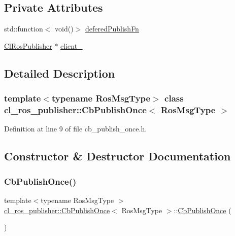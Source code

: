 \subsection*{Private Attributes}
\begin{DoxyCompactItemize}
\item 
std\+::function$<$ void()$>$ \hyperlink{classcl__ros__publisher_1_1CbPublishOnce_a6222a91fb87cd3118ca9f84ff857c696}{defered\+Publish\+Fn}
\item 
\hyperlink{classcl__ros__publisher_1_1ClRosPublisher}{Cl\+Ros\+Publisher} $\ast$ \hyperlink{classcl__ros__publisher_1_1CbPublishOnce_aabb127ac2192a295ce9d11c63f3c9595}{client\+\_\+}
\end{DoxyCompactItemize}


\subsection{Detailed Description}
\subsubsection*{template$<$typename Ros\+Msg\+Type$>$\newline
class cl\+\_\+ros\+\_\+publisher\+::\+Cb\+Publish\+Once$<$ Ros\+Msg\+Type $>$}



Definition at line 9 of file cb\+\_\+publish\+\_\+once.\+h.



\subsection{Constructor \& Destructor Documentation}
\mbox{\label{classcl__ros__publisher_1_1CbPublishOnce_a9706b20ed8ed9af79396a446abf44344}} 
\subsubsection{\texorpdfstring{Cb\+Publish\+Once()}{CbPublishOnce()}\hspace{0.1cm}{\footnotesize\ttfamily [1/2]}}
{\footnotesize\ttfamily template$<$typename Ros\+Msg\+Type $>$ \\
\hyperlink{classcl__ros__publisher_1_1CbPublishOnce}{cl\+\_\+ros\+\_\+publisher\+::\+Cb\+Publish\+Once}$<$ Ros\+Msg\+Type $>$\+::\hyperlink{classcl__ros__publisher_1_1CbPublishOnce}{Cb\+Publish\+Once} (\begin{DoxyParamCaption}{ }\end{DoxyParamCaption})\hspace{0.3cm}{\ttfamily [inline]}}



